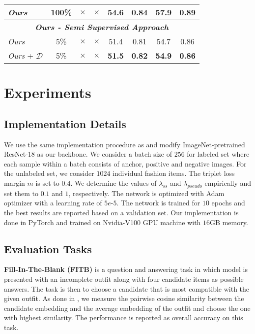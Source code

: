 \documentclass[sigconf]{acmart}
\newcommand{\xmark}{\color{algoGreen}$\bm{\times}$}
\begin{document}
\begin{table*}[t]
{\begin{tabular}{l|ccc|cc|cc}
        \textit{Ours} & {\color{red}100\%} & \xmark & \xmark  & 54.6 & 0.84 & 57.9 & 0.89 \\
  \hline \multicolumn{8}{c}{\textit{\textbf{Ours - Semi Supervised Approach}}} \\
  \hline 
    \textit{Ours} & {\color{algoGreen}5\%} & \xmark & \xmark  & 51.4 & 0.81 & 54.7 & 0.86 \\
    \textit{Ours} + $\mathcal{D}$ & {\color{algoGreen}5\%} & \xmark & \xmark  & \textbf{51.5} & \textbf{0.82} & \textbf{54.9} & \textbf{0.86} \\
    \hline 
    \end{tabular}
    }
    \label{tab:main}
\end{table*}
 
\section{Experiments}

\subsection{Implementation Details}
\label{sec:impl}
We use the same implementation procedure as \cite{iccv2019learning, eccv2018learning} and modify ImageNet-pretrained ResNet-18 \cite{resnet} as our backbone. We consider a batch size of $256$ for labeled set where each sample within a batch consists of anchor, positive and negative images. For the unlabeled set, we consider $1024$ individual fashion items. The triplet loss margin $m$ is set to $0.4$. We determine the values of $\lambda_{ss}$ and $\lambda_{pseudo}$ empirically and set them to $0.1$ and $1$, respectively. The network is optimized with Adam \cite{kingma2014adam} optimizer with a learning rate of $5e$-$5$. The network is trained for $10$ epochs and the best results are reported based on a validation set. Our implementation is done in PyTorch \cite{paszke2019pytorch} and trained on Nvidia-V100 GPU machine with $16$GB memory.

\subsection{Evaluation Tasks}
\noindent \textbf{Fill-In-The-Blank (FITB)} is a question and answering task in which model is presented with an incomplete outfit along with four candidate items as possible answers. The task is then to choose a candidate that is most compatible with the given outfit. As done in \cite{eccv2018learning}, we measure the pairwise cosine similarity between the candidate embedding and the average embedding of the outfit and choose the one with highest similarity. The performance is reported as overall accuracy on this task.
\end{document}
